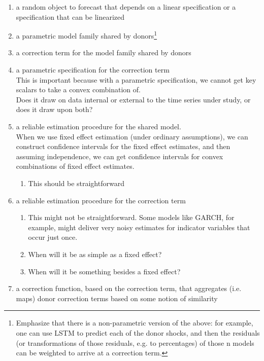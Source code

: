\documentclass[11pt]{article}
\theoremstyle{definition}
\begin{document}
\begin{enumerate}
  \item a random object to forecast that depends on a linear specification or a specification that can be linearized
  \item a parametric model family shared by donors\footnote{Emphasize that there is a non-parametric version of the above: for example, one can use LSTM to predict each of the donor shocks, and then the residuals (or transformations of those residuals, e.g. to percentages) of those n models can be weighted to arrive at a correction term.}
  \item a correction term for the model family shared by donors
  \item a parametric specification for the correction term\\
  
  
This is important because with a parametric specification, we cannot get key scalars to take a convex combination of.\\

Does it draw on data internal or external to the time series under study, or does it draw upon both?

  \item a reliable estimation procedure for the shared model. \\
  
  When we use fixed effect estimation (under ordinary assumptions), we can construct confidence intervals for the fixed effect estimates, and then assuming independence, we can get confidence intervals for convex combinations of fixed effect estimates.
  

  \begin{enumerate}
  \item This should be straightforward
  \end{enumerate}
  \item a reliable estimation procedure for the correction term 
  \begin{enumerate}
    \item This might not be straightforward.  Some models like GARCH, for example, might deliver very noisy estimates for indicator variables that occur just once.
    \item When will it be as simple as a fixed effect?
    \item When will it be something besides a fixed effect?
    \end{enumerate}
  \item a correction function, based on the correction term, that aggregates (i.e. maps) donor correction terms based on some notion of similarity
\end{enumerate}
\end{document}
